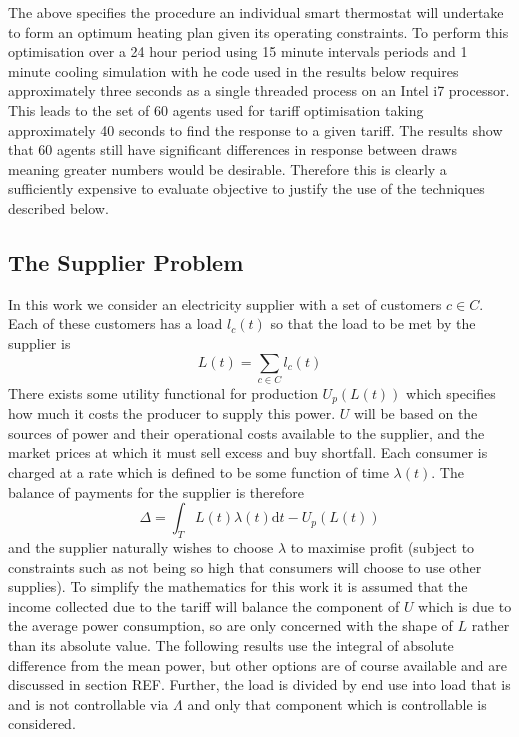 \documentclass[a4paper, 10 pt, conference]{ieeeconf}  %
\begin{document}
The above specifies the procedure an individual smart thermostat will undertake to form an optimum heating plan given its operating constraints. To perform this optimisation over a 24 hour period using 15 minute intervals periods and 1 minute cooling simulation with he code used in the results below requires approximately three seconds as a single threaded process on an Intel i7 processor. This leads to the set of 60 agents used for tariff optimisation taking approximately 40 seconds to find the response to a given tariff. The results show that 60 agents still have significant differences in response between draws meaning greater numbers would be desirable. Therefore this is clearly a sufficiently expensive to evaluate objective to justify the use of the techniques described below. 

\subsection{The Supplier Problem}
In this work we consider an electricity supplier with a set of customers $c \in C$. Each of these customers has a load $l_{c}(t)$  so that the load to be met by the supplier is
\begin{equation}
L(t) = \sum_{c \in C} l_{c}(t)
\end{equation}
There exists some utility functional for production $U_{p}(L(t))$ which specifies how much it costs the producer to supply this power. $U$ will be based on the sources of power and their operational costs available to the supplier, and the market prices at which it must sell excess and buy shortfall.
Each consumer is charged at a rate which is defined to be some function of time $\lambda (t)$. The balance of payments for the supplier is therefore
\begin{equation}
\Delta = \int_{T}L(t) \lambda(t) \mathrm{d}t - U_{p}(L(t))
\end{equation}
and the supplier naturally wishes to choose $\lambda$ to maximise profit (subject to constraints such as not being so high that consumers will choose to use other supplies). To simplify the mathematics for this work it is assumed that the income collected due to the tariff will balance the component of $U$ which is due to the average power consumption, so are only concerned with the shape of $L$ rather than its absolute value. The following results use the integral of absolute difference from the mean power, but other options are of course available and are discussed in section REF.
Further, the load is divided by end use into load that is and is not controllable via $\Lambda$ and only that component which is controllable is considered.
\end{document}
